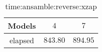 \begin{table}[!ht]
	\centering
	\begin{tabular}{|c|c|c|}
		\hline
		Models & $4$ & $7$ \\ \hline
		elapsed & $843.80$ & $894.95$ \\ \hline
	\end{tabular}
	\caption{time:ansamble:reverse:xzap}
	\label{tab:time:ansamble:reverse:xzap}
\end{table}
